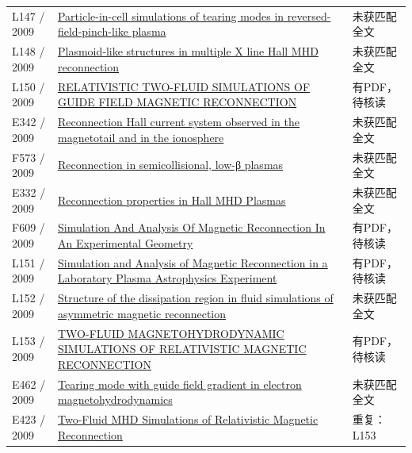 \begin{longtable}{P{24mm}P{97mm}P{27mm}}
L147 / 2009 & \href{https://doi.org/10.1063/1.3079075}{Particle-in-cell simulations of tearing modes in reversed-field-pinch-like plasma} & 未获匹配全文\\

L148 / 2009 & \href{https://doi.org/10.1029/2009ja014257}{Plasmoid‐like structures in multiple X line Hall MHD reconnection} & 未获匹配全文\\

L150 / 2009 & \href{https://doi.org/10.1088/0004-637x/705/1/907}{RELATIVISTIC TWO-FLUID SIMULATIONS OF GUIDE FIELD MAGNETIC RECONNECTION} & 有PDF，待核读\\

E342 / 2009 & \href{https://doi.org/10.1029/2009gl037239}{Reconnection Hall current system observed in the magnetotail and in the ionosphere} & 未获匹配全文\\

F573 / 2009 & \href{https://doi.org/10.1063/1.3155453}{Reconnection in semicollisional,  low-β plasmas} & 未获匹配全文\\

E332 / 2009 & \href{http://absimage.aps.org/image/DPP09/MWS_DPP09-2009-000900.pdf}{Reconnection properties in Hall MHD Plasmas} & 未获匹配全文\\

F609 / 2009 & \href{https://doi.org/10.5281/zenodo.47876}{Simulation And Analysis Of Magnetic Reconnection In An Experimental Geometry} & 有PDF，待核读\\

L151 / 2009 & \href{https://doi.org/10.5281/zenodo.16803}{Simulation and Analysis of Magnetic Reconnection in a Laboratory Plasma Astrophysics Experiment} & 有PDF，待核读\\

L152 / 2009 & \href{https://doi.org/10.1063/1.3086867}{Structure of the dissipation region in fluid simulations of asymmetric magnetic reconnection} & 未获匹配全文\\

L153 / 2009 & \href{https://doi.org/10.1088/0004-637x/696/2/1385}{TWO-FLUID MAGNETOHYDRODYNAMIC SIMULATIONS OF RELATIVISTIC MAGNETIC RECONNECTION} & 有PDF，待核读\\

E462 / 2009 & \href{https://doi.org/10.1063/1.3078470}{Tearing mode with guide field gradient in electron magnetohydrodynamics} & 未获匹配全文\\

E423 / 2009 & \href{https://arxiv.org/abs/0902.2074v1}{Two-Fluid MHD Simulations of Relativistic Magnetic Reconnection} & 重复：L153\\


\end{longtable}
